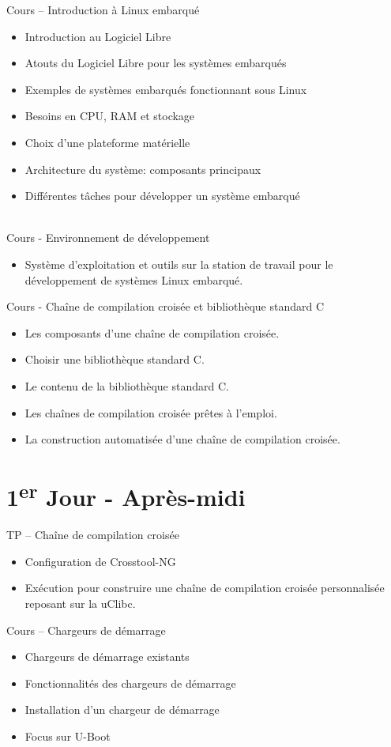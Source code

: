 \documentclass[a4paper,12pt,obeyspaces,spaces,hyphens]{article}
\begin{document}
\feagendaonecolumn
{Cours – Introduction à Linux embarqué}
{
  \begin{itemize}
  \item Introduction au Logiciel Libre
  \item Atouts du Logiciel Libre pour les systèmes embarqués
  \item Exemples de systèmes embarqués fonctionnant sous Linux
  \item Besoins en CPU, RAM et stockage
  \item Choix d'une plateforme matérielle
  \item Architecture du système: composants principaux
  \item Différentes tâches pour développer un système embarqué
  \end{itemize}
}
\\
\feagendatwocolumn
{Cours - Environnement de développement}
{
  \begin{itemize}
  \item Système d'exploitation et outils sur la station de travail
	pour le développement de systèmes Linux embarqué.
  \end{itemize}
}
{Cours - Chaîne de compilation croisée et bibliothèque standard C}
{
  \begin{itemize}
  \item Les composants d'une chaîne de compilation croisée.
  \item Choisir une bibliothèque standard C.
  \item Le contenu de la bibliothèque standard C.
  \item Les chaînes de compilation croisée prêtes à l'emploi.
  \item La construction automatisée d'une chaîne de compilation croisée.
  \end{itemize}
}

\section{1\textsuperscript{er} Jour - Après-midi}
\feagendatwocolumn
{TP – Chaîne de compilation croisée}
{
  \begin{itemize}
  \item Configuration de Crosstool-NG
  \item Exécution pour construire une chaîne de compilation croisée
	personnalisée reposant sur la uClibc.
  \end{itemize}
}
{Cours – Chargeurs de démarrage}
{
  \begin{itemize}
  \item Chargeurs de démarrage existants
  \item Fonctionnalités des chargeurs de démarrage
  \item Installation d'un chargeur de démarrage
  \item Focus sur U-Boot
  \end{itemize}
}
\\
\end{document}
